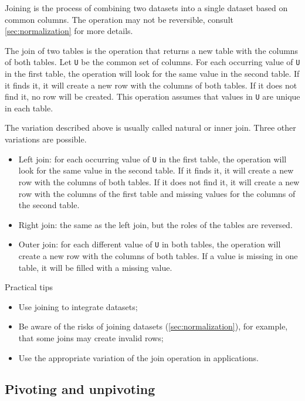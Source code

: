 Joining is the process of combining two datasets into a single dataset based on common
columns.  The operation may not be reversible, consult \cref{sec:normalization} for more
details.

The join of two tables is the operation that returns a new table with the columns of both
tables.  Let \texttt{U} be the common set of columns.  For each occurring value of
\texttt{U} in the first table, the operation will look for the same value in the second
table.  If it finds it, it will create a new row with the columns of both tables.  If it
does not find it, no row will be created.  This operation assumes that values in \texttt{U}
are unique in each table.

The variation described above is usually called natural or inner join.  Three other
variations are possible.
\begin{itemize}
  \item Left join: for each occurring value of \texttt{U} in the first table, the operation
    will look for the same value in the second table.  If it finds it, it will create a new
    row with the columns of both tables.  If it does not find it, it will create a new row
    with the columns of the first table and missing values for the columns of the second
    table.
  \item Right join: the same as the left join, but the roles of the tables are reversed.
  \item Outer join: for each different value of \texttt{U} in both tables, the operation
    will create a new row with the columns of both tables.  If a value is missing in one
    table, it will be filled with a missing value.
\end{itemize}

\begin{hlbox}{Practical tips}
  \begin{itemize}
    \item Use joining to integrate datasets;
    \item Be aware of the risks of joining datasets (\cref{sec:normalization}), for
      example, that some joins may create invalid rows;
    \item Use the appropriate variation of the join operation in applications.
  \end{itemize}
\end{hlbox}

\subsection{Pivoting and unpivoting}

